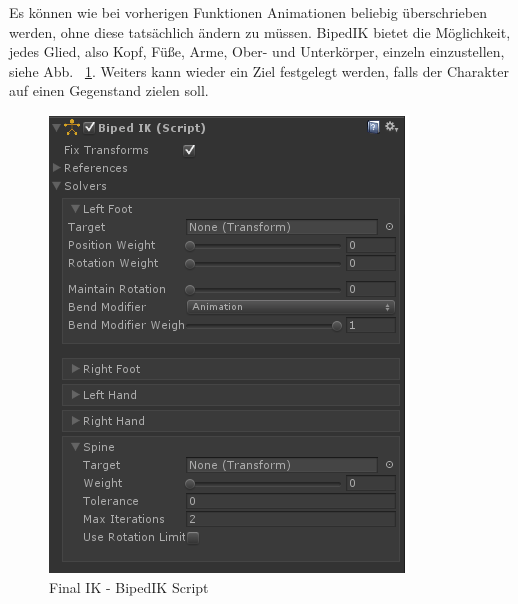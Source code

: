 Es können wie bei vorherigen Funktionen Animationen beliebig überschrieben werden, ohne diese tatsächlich ändern zu müssen.
BipedIK bietet die Möglichkeit, jedes Glied, also Kopf, Füße, Arme, Ober- und Unterkörper, einzeln einzustellen, siehe Abb. ~\ref{fig:finalIK_bipedik_script}.
Weiters kann wieder ein Ziel festgelegt werden, falls der Charakter auf einen Gegenstand zielen soll.
\begin {figure}
    \centering
    \includegraphics[scale=0.8]{pics/finalik_bipedik_script}
    \caption{Final IK - BipedIK Script}
    \label{fig:finalIK_bipedik_script}
\end {figure}
~\cite{FinalIK_BipedIK_2021}

